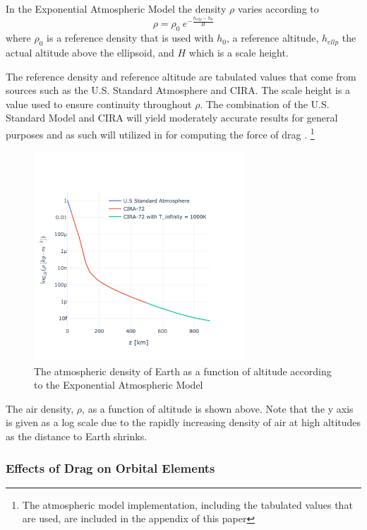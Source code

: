 \documentclass[a4paper, 12pt]{article}
\begin{document}
In the Exponential Atmospheric Model the density $\rho$ varies according to
\begin{equation}
	\rho = \rho_0\:e^{-\frac{h_{ellp} - h_0}{H}}
\end{equation}
where $\rho_0$ is a reference density that is used with $h_0$,  a reference altitude,  $h_{ellp}$ the actual altitude above the ellipsoid, and $H$ which is a scale height.

The reference density and reference altitude are tabulated values that come from sources such as the U.S. Standard Atmosphere and CIRA. The scale height is a value used to ensure continuity throughout $\rho$. The combination of the U.S. Standard Model and CIRA will yield moderately accurate results for general purposes and as such will utilized in for computing the force of drag \citep{vallado_d._2013}. \footnote{The atmospheric model implementation, including the tabulated values that are used, are included in the appendix of this paper}

\begin{figure}[h]
	\centering     %
	\includegraphics[width=0.7\textwidth]{Atmospheric_Density_v_Altitude}
	\caption{The atmospheric density of Earth as a function of altitude according to the Exponential Atmospheric Model}
\end{figure}

The air density, $\rho$, as a function of altitude is shown above. Note that the y axis is given as a log scale due to the rapidly increasing density of air at high altitudes as the distance to Earth shrinks.

\subsubsection{Effects of Drag on Orbital Elements}
\end{document}
